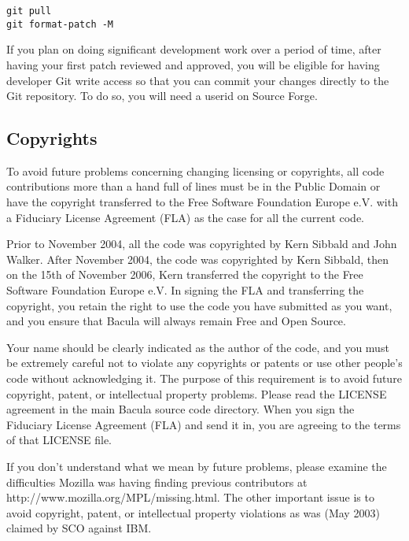 \begin{verbatim}
git pull
git format-patch -M
\end{verbatim}

If you plan on doing significant development work over a period of time,
after having your first patch reviewed and approved, you will be eligible
for having developer Git write access so that you can commit your changes
directly to the Git repository.  To do so, you will need a userid on Source
Forge.

\subsection{Copyrights}

To avoid future problems concerning changing licensing or
copyrights, all code contributions more than a hand full of lines
must be in the Public Domain or have the copyright transferred to
the Free Software Foundation Europe e.V. with a Fiduciary License
Agreement (FLA) as the case for all the current code.

Prior to November 2004, all the code was copyrighted by Kern Sibbald and
John Walker.  After November 2004, the code was copyrighted by Kern
Sibbald, then on the 15th of November 2006, Kern transferred the copyright
to the Free Software Foundation Europe e.V. In signing the FLA and
transferring the copyright, you retain the right to use the code you have
submitted as you want, and you ensure that Bacula will always remain Free
and Open Source.

Your name should be clearly indicated as the author of the code, and you
must be extremely careful not to violate any copyrights or patents or use
other people's code without acknowledging it.  The purpose of this
requirement is to avoid future copyright, patent, or intellectual property
problems.  Please read the LICENSE agreement in the main Bacula source code
directory.  When you sign the Fiduciary License Agreement (FLA) and send it
in, you are agreeing to the terms of that LICENSE file.

If you don't understand what we mean by future problems, please
examine the difficulties Mozilla was having finding
previous contributors at 
{http://www.mozilla.org/MPL/missing.html}. The other important issue is to
avoid copyright, patent, or intellectual property violations as was
(May 2003) claimed by SCO against IBM.

